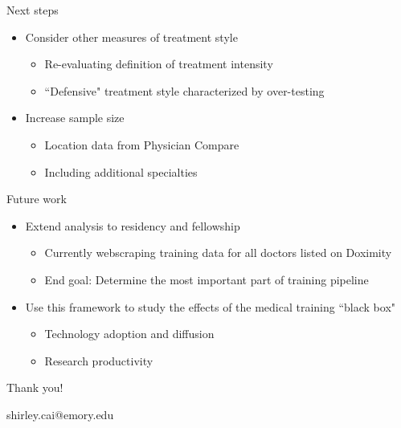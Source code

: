 \documentclass[10pt,aspectratio=169]{beamer}
\begin{document}
\begin{frame}{Next steps}
    \begin{itemize}
        \item Consider other measures of treatment style
            \begin{itemize}
                \item Re-evaluating definition of treatment intensity 
                \item ``Defensive" treatment style characterized by over-testing  
            \end{itemize}
        \vspace{2.5mm}
        \item Increase sample size
            \begin{itemize}
                \item Location data from Physician Compare
                \item Including additional specialties 
            \end{itemize}
    \end{itemize}
\end{frame}

\begin{frame}{Future work}
    \begin{itemize}
        \item Extend analysis to residency and fellowship 
            \begin{itemize}
                \item Currently webscraping training data for all doctors listed on Doximity 
                \item End goal: Determine the most important part of training pipeline
            \end{itemize}
        \vspace{2.5mm}
        \item Use this framework to study the effects of the medical training ``black box" 
            \begin{itemize}
                \item Technology adoption and diffusion 
                \item Research productivity
            \end{itemize}
    \end{itemize}    
\end{frame}

\begin{frame}[standout]
    \Large Thank you! 
    
    \vspace{5mm}
    \small shirley.cai@emory.edu
\end{frame}
\end{document}

